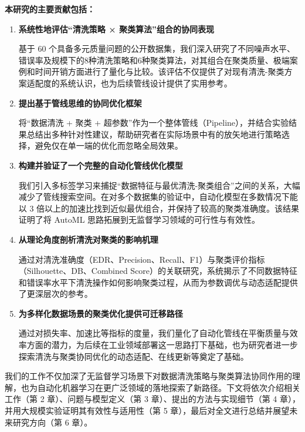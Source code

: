 \documentclass[10pt]{article} %
\numberwithin{equation}{section}
\begin{document}
\textbf{本研究的主要贡献包括：}
\begin{enumerate}
    \item \textbf{系统性地评估“清洗策略 × 聚类算法”组合的协同表现}

    基于 60 个具备多元质量问题的公开数据集，我们深入研究了不同噪声水平、错误率及规模下的8种清洗策略和6种聚类算法，对其组合在聚类质量、极端案例和时间开销方面进行了量化与比较。该评估不仅提供了对现有清洗-聚类方案适配度的系统认识，也为后续管线设计提供了实用参考。

    \item \textbf{提出基于管线思维的协同优化框架}

    将“数据清洗 + 聚类 + 超参数”作为一个整体管线（Pipeline），并结合实验结果总结出多种针对性建议，帮助研究者在实际场景中有的放矢地进行策略选择，避免仅在单一端的优化而忽略全局效果。

    \item \textbf{构建并验证了一个完整的自动化管线优化模型}

    我们引入多标签学习来捕捉“数据特征与最优清洗-聚类组合”之间的关系，大幅减少了管线搜索空间。在对多个数据集的验证中，自动化模型在多数情况下能以 3 倍以上的加速比找到近似最优组合，并保持了较高的聚类准确度。该结果证明了将 AutoML 思路拓展到无监督学习领域的可行性与有效性。

    \item \textbf{从理论角度剖析清洗对聚类的影响机理}

    通过对清洗准确度（EDR、Precision、Recall、F1）与聚类评价指标（Silhouette、DB、Combined Score）的关联研究，系统揭示了不同数据特征和错误率水平下清洗操作如何影响聚类过程，从而为参数调优与动态适配提供了更深层次的参考。

    \item \textbf{为多样化数据场景的聚类优化提供可迁移路径}

    通过对损失率、加速比等指标的度量，我们量化了自动化管线在平衡质量与效率方面的潜力，为后续在工业领域部署这一思路打下基础，也为研究者进一步探索清洗与聚类协同优化的动态适配、在线更新等奠定了基础。
\end{enumerate}

我们的工作不仅加深了无监督学习场景下对数据清洗策略与聚类算法协同作用的理解，也为自动化机器学习在更广泛领域的落地探索了新路径。下文将依次介绍相关工作（第 2 章）、问题与模型定义（第 3 章）、提出的方法与实现细节（第 4 章），并用大规模实验证明其有效性与适用性（第 5 章），最后对全文进行总结并展望未来研究方向（第 6 章）。


\end{document}
